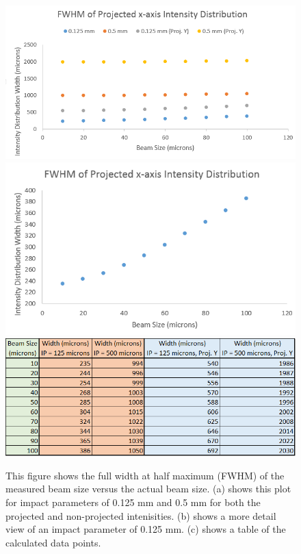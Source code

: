 \documentclass[12pt]{article}
\begin{document}
\begin{figure}
\begin{center}
\includegraphics[scale=0.5]{figures/FWHM.PNG}
\includegraphics[scale=0.5]{figures/FWHM_125.PNG}
\includegraphics[scale=0.5]{figures/FWHM_Table.PNG}
\caption{This figure shows the full width at half maximum (FWHM) of the measured beam size versus the actual beam size. (a) shows this plot for impact parameters of 0.125 mm and 0.5 mm for both the projected and non-projected intenisities. (b) shows a more detail view of an impact parameter of 0.125 mm. (c) shows a table of the calculated data points.}
\end{center}
\end{figure}
\end{document}
